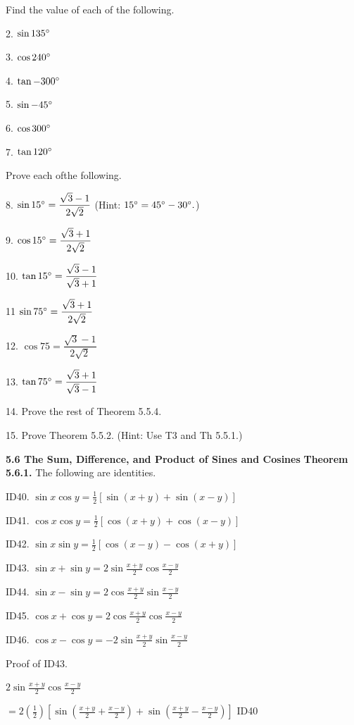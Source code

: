\newpage

Find the value of each of the following. \nl

2. $\sin 135^{\circ}$ \nl

3. $\cos 240^{\circ}$ \nl

4. $\tan -300^{\circ}$ \nl

5. $\sin -45^{\circ}$ \nl

6. $\cos 300^{\circ}$ \nl

7. $\tan 120^{\circ}$ \nl

Prove each ofthe following. \nl

8. $\sin 15^{\circ} = \dfrac{\sqrt{3} - 1}{2\sqrt{2}}$ (Hint: $15^{\circ} = 45^{\circ} - 30^{\circ}.$) \nl

9. $\cos 15^{\circ} = \dfrac{\sqrt{3} + 1}{2\sqrt{2}}$ \nl

10. $\tan 15^{\circ} = \dfrac{\sqrt{3} - 1}{\sqrt{3} + 1}    $\nl

11 $\sin 75^{\circ} = \dfrac{\sqrt{3} + 1}{2\sqrt{2}}$\nl

12. $\cos 75 = \dfrac{\sqrt{3} - 1}{2\sqrt{2}}$ \nl

13. $\tan 75^{\circ} = \dfrac{\sqrt{3} + 1}{\sqrt{3} - 1}$\nl


14. Prove the rest of Theorem 5.5.4. \nl


15. Prove Theorem 5.5.2. (Hint: Use T3 and Th 5.5.1.) \nl

\vfill

\textbf{5.6 The Sum, Difference, and Product of Sines and Cosines}\nl
\textbf{Theorem 5.6.1.} The following are identities. \nl

ID40. $\sin x \cos y = \frac{1}{2}[\sin (x + y) + \sin(x - y)]$ \nl

ID41. $\cos x \cos y = \frac{1}{2}[\cos (x + y) + \cos(x - y)] $\nl

\newpage
ID42. $\sin x \sin y = \frac{1}{2}[\cos (x - y) - \cos (x + y)]$\nl

ID43. $\sin x + \sin y = 2\sin \frac{x + y}{2} \cos\frac{x - y}{2}$\nl

ID44. $\sin x - \sin y = 2\cos \frac{x + y}{2} \sin\frac{x - y}{2}      $\nl

ID45. $\cos x + \cos y = 2\cos \frac{x + y}{2}\cos\frac{x - y}{2}$\nl

ID46. $\cos x - \cos y = -2\sin \frac{x + y}{2}\sin\frac{x-y}{2}$\nl

Proof of ID43.\nl

$2\sin\frac{x+y}{2}\cos\frac{x-y}{2}$\nl

$=2\left( \frac{1}{2}\right)[\sin \left(\frac{x+y}{2} + \frac{x-y}{2}\right) + \sin \left(\frac{x+y}{2} - \frac{x-y}{2} \right)]$         ID40\nl

